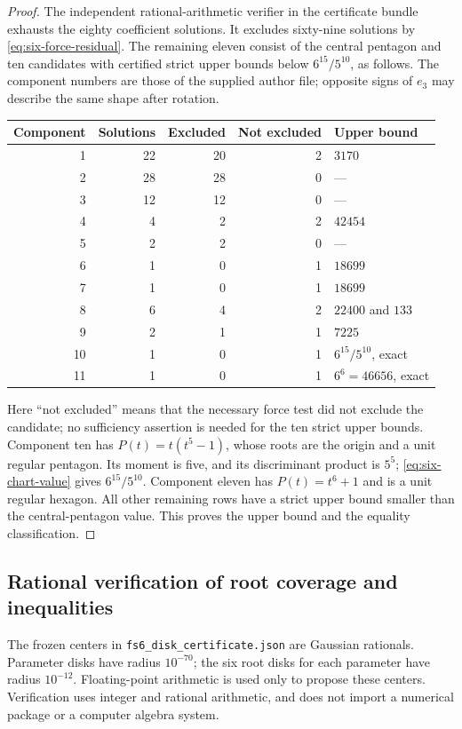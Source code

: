 \documentclass[11pt]{article}
\theoremstyle{remark}
\numberwithin{equation}{section}
\begin{document}
\begin{proof}
The independent rational-arithmetic verifier in the certificate
bundle exhausts the eighty coefficient solutions.  It excludes
sixty-nine solutions by \eqref{eq:six-force-residual}.  The remaining
eleven consist of the central pentagon and ten candidates with
certified strict upper bounds below $6^{15}/5^{10}$, as follows.
The component numbers are those of the supplied author file;
opposite signs of $e_3$ may describe the same shape after rotation.
\begin{center}
\begin{tabular}{rrrrl}
\toprule
Component&Solutions&Excluded&Not excluded&Upper bound\\
\midrule
1&22&20&2&$3170$\\
2&28&28&0&---\\
3&12&12&0&---\\
4&4&2&2&$42454$\\
5&2&2&0&---\\
6&1&0&1&$18699$\\
7&1&0&1&$18699$\\
8&6&4&2&$22400$ and $133$\\
9&2&1&1&$7225$\\
10&1&0&1&$6^{15}/5^{10}$, exact\\
11&1&0&1&$6^6=46656$, exact\\
\bottomrule
\end{tabular}
\end{center}
Here ``not excluded'' means that the necessary force test did not
exclude the candidate; no sufficiency assertion is needed for the
ten strict upper bounds.
Component ten has $P(t)=t(t^5-1)$, whose roots are the origin and a
unit regular pentagon.  Its moment is five, and its discriminant
product is $5^5$; \eqref{eq:six-chart-value} gives $6^{15}/5^{10}$.
Component eleven has $P(t)=t^6+1$ and is a unit regular hexagon.
All other remaining rows have a strict upper bound smaller than
the central-pentagon value.  This proves the upper bound and the
equality classification.
\end{proof}

\subsection{Rational verification of root coverage and inequalities}
\label{sec:six-disk-certificate}
The frozen centers in \texttt{fs6\_disk\_certificate.json} are
Gaussian rationals.  Parameter disks have radius $10^{-70}$; the
six root disks for each parameter have radius $10^{-12}$.
Floating-point arithmetic is used only to propose these centers.
Verification uses integer and rational arithmetic, and does not
import a numerical package or a computer algebra system.
\end{document}
